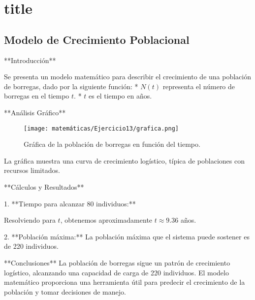 \chapter*{title}
\section{Modelo de Crecimiento Poblacional}

    **Introducción**

    Se presenta un modelo matemático para describir el crecimiento de una población de borregas, dado por la siguiente función:
    * $N(t)$ representa el número de borregas en el tiempo $t$.
    * $t$ es el tiempo en años.

    **Análisis Gráfico**

    \begin{figure}[h]
    \centering
    \texttt{[image: matemáticas/Ejercicio13/grafica.png]}
    \caption{Gráfica de la población de borregas en función del tiempo.}
    \end{figure}

    La gráfica muestra una curva de crecimiento logístico, típica de poblaciones con recursos limitados.

    **Cálculos y Resultados**

    1. **Tiempo para alcanzar 80 individuos:**

    Resolviendo para $t$, obtenemos aproximadamente $t \approx 9.36$ años.

    2. **Población máxima:**
    La población máxima que el sistema puede sostener es de 220 individuos.

    **Conclusiones**
    La población de borregas sigue un patrón de crecimiento logístico, alcanzando una capacidad de carga de 220 individuos. El modelo matemático proporciona una herramienta útil para predecir el crecimiento de la población y tomar decisiones de manejo.
